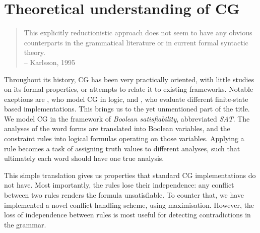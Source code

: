 

\section{Theoretical understanding of CG}

\begin{quote}
This explicitly reductionistic approach does not seem to have any obvious counterparts in the grammatical literature or in current formal syntactic theory. \\
-- Karlsson, 1995
\end{quote}

Throughout its history, CG has been very practically oriented, with 
little studies on its formal properties, or attempts to relate it to existing
frameworks.
Notable exeptions are \cite{lager_nivre01}, who model CG in logic, and \cite{nemeskey14}, who evaluate different finite-state based implementations.
This brings us to the yet unmentioned part of the title.
We model CG in the framework of \emph{Boolean satisfiability}, abbreviated \emph{SAT}.
The analyses of the word forms are translated into Boolean variables, 
and the constraint rules into logical formulas operating on those variables.
Applying a rule becomes a task of assigning truth values to different analyses,
such that ultimately each word should have one true analysis.

This simple translation gives us properties that standard CG implementations do not have.
Most importantly, the rules lose their independence: any conflict between two rules renders the formula unsatisfiable. To counter that, we have implemented a novel conflict handling scheme, using maximisation. However, the loss of independence between rules is most useful for detecting contradictions in the grammar.



